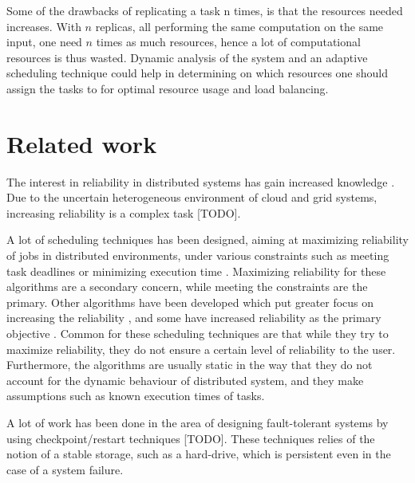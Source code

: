 \documentclass{cslthse-msc}
\begin{document}
Some of the drawbacks of replicating a task n times, is that the resources needed increases. With $n$ replicas, all performing the same computation on the same input, one need $n$ times as much resources, hence a lot of computational resources is thus wasted. Dynamic analysis of the system and an adaptive scheduling technique could help in determining on which resources one should assign the tasks to for optimal resource usage and load balancing. 

\section{Related work} \label{sec:related_work}
The interest in reliability in distributed systems has gain increased knowledge \cite{replicationManagement}. Due to the uncertain heterogeneous environment of cloud and grid systems, increasing reliability is a complex task [TODO]. %

A lot of scheduling techniques has been designed, aiming at maximizing reliability of jobs in distributed environments, under various constraints such as meeting task deadlines or minimizing execution time \cite{algoOptTimeMaxRel} \cite{optTaskAllocationForMaxRel} \cite{taskAllocation} \cite{taskAllocationSwarm} \cite{algoMaxRelEndToEndConstraint} \cite{algoMinExTime}  \cite{schedReplicas}. Maximizing reliability for these algorithms are a secondary concern, while meeting the constraints are the primary. Other algorithms have been developed which put greater focus on increasing the reliability \cite{optResourceAllMaxPerformance} \cite{matchSchedAlgoMinFailure}, and some have increased reliability as the primary objective \cite{safetyRelTaskAllocation} \cite{improvedTaskAllMaxRel}. Common for these scheduling techniques are that while they try to maximize reliability, they do not ensure a certain level of reliability to the user. Furthermore, the algorithms are usually static in the way that they do not account for the dynamic behaviour of distributed system, and they make assumptions such as known execution times of tasks.

A lot of work has been done in the area of designing fault-tolerant systems by using checkpoint/restart techniques [TODO]. %
These techniques relies of the notion of a stable storage, such as a hard-drive, which is persistent even in the case of a system failure.
\end{document}
